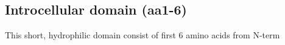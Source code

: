 \subsection{Introcellular domain (aa1-6)}

This short, hydrophilic domain consist of first 6 amino acids from N-term